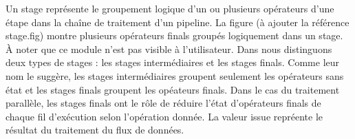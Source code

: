 Un stage repr\'esente le groupement logique d'un ou plusieurs op\'erateurs d'une \'etape dans la cha\^ine de traitement d'un pipeline. La figure (\`a ajouter la r\'ef\'erence stage.fig) montre plusieurs op\'erateurs finals group\'es logiquement dans un stage.  \`A noter que ce module n'est pas visible \`a l'utilisateur. Dans  nous distinguons deux types de stages : les stages interm\'ediaires et les stages finals. Comme leur nom le sugg\`ere, les stages interm\'ediaires groupent seulement les op\'erateurs sans \'etat et les stages finals groupent les op\'eateurs finals. Dans le cas du traitement parall\`ele, les stages finals ont le r\^ole de r\'eduire l'\'etat d'op\'erateurs finals de chaque fil d'ex\'ecution selon l'op\'eration donn\'ee. La valeur issue repr\'eente le r\'esultat du traitement du flux de donn\'ees.




